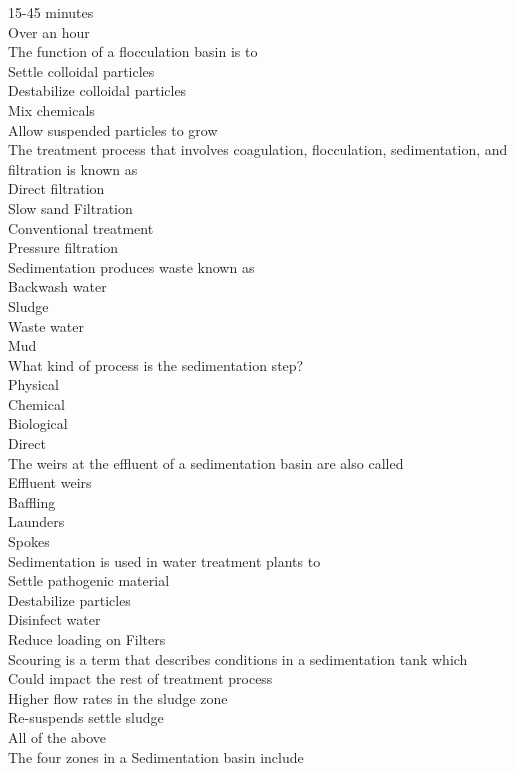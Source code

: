 15-45 minutes\\
Over an hour\\
 The function of a flocculation basin is to\\
Settle colloidal particles\\
Destabilize colloidal particles\\
Mix chemicals\\
Allow suspended particles to grow\\
The treatment process that involves coagulation, flocculation, sedimentation, and filtration is known as\\
Direct filtration\\
Slow sand Filtration\\
Conventional treatment\\
Pressure filtration\\
 Sedimentation produces waste known as\\
Backwash water\\
Sludge\\
Waste water\\
Mud\\
 What kind of process is the sedimentation step?\\
Physical\\
Chemical\\
Biological\\
Direct\\
 The weirs at the effluent of a sedimentation basin are also called\\
Effluent weirs\\
Baffling\\
Launders\\
Spokes\\
 Sedimentation is used in water treatment plants to\\
Settle pathogenic material\\
Destabilize particles\\
Disinfect water\\
Reduce loading on Filters\\
 Scouring is a term that describes conditions in a sedimentation tank which\\
Could impact the rest of treatment process\\
Higher flow rates in the sludge zone\\
Re-suspends settle sludge\\
All of the above\\
The four zones in a Sedimentation basin include\\
